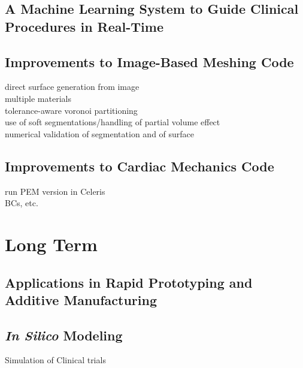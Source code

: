 \subsection[A Machine Learning System to Guide Clinical Procedures in \newline Real-Time]{\texorpdfstring{A Machine Learning System to Guide Clinical \newline Procedures in Real-Time}{A Machine Learning System to Guide Clinical \newline Procedures in Real-Time}}
\label{A Machine Learning System to Guide Clinical Procedures in Real-Time}

\subsection{Improvements to Image-Based Meshing Code}
\label{Improvements to Image-Based Meshing Code}
direct surface generation from image \\
multiple materials \\
tolerance-aware voronoi partitioning \\
use of soft segmentations/handling of partial volume effect  \\
numerical validation of segmentation and of surface

\subsection{Improvements to Cardiac Mechanics Code}
\label{Improvements to Cardiac Mechanics Code}
run PEM version in Celeris \\
BCs, etc.

\section{Long Term}
\label{Long Term}

\subsection[Applications in Rapid Prototyping and Additive Manufacturing]{\texorpdfstring{Applications in Rapid Prototyping and Additive \newline Manufacturing}{Applications in Rapid Prototyping and Additive \newline Manufacturing}}
\label{Applications in Rapid Prototyping and Additive Manufacturing}

\subsection{\textit{In Silico} Modeling}
\label{In Silico Modeling}
Simulation of Clinical trials


